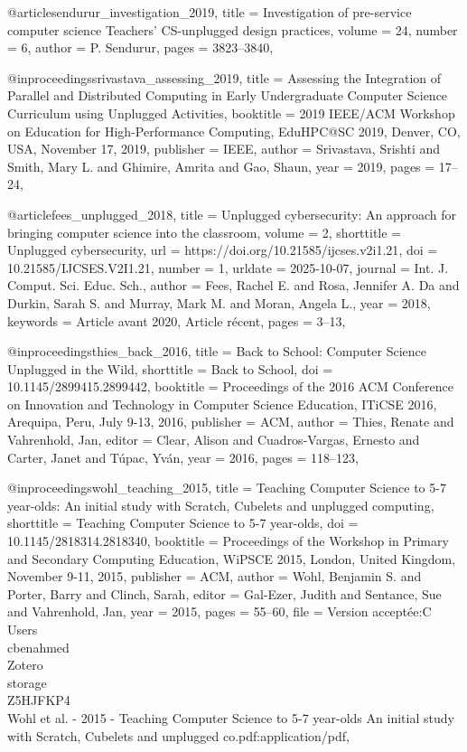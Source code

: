 @article{sendurur_investigation_2019,
	title = {Investigation of pre-service computer science Teachers' CS-unplugged design practices},
	volume = {24},
	number = {6},
	author = {P. Sendurur},
	pages = {3823--3840},
}

@inproceedings{srivastava_assessing_2019,
	title = {Assessing the Integration of Parallel and Distributed Computing in Early Undergraduate Computer Science 
Curriculum using Unplugged Activities},
	booktitle = {2019 IEEE/ACM Workshop on Education for High-Performance Computing, EduHPC@SC 2019, Denver, CO, USA, 
November 17, 2019},
	publisher = {IEEE},
	author = {Srivastava, Srishti and Smith, Mary L. and Ghimire, Amrita and Gao, Shaun},
	year = {2019},
	pages = {17--24},
}

@article{fees_unplugged_2018,
	title = {Unplugged cybersecurity: {An} approach for bringing computer science into the classroom},
	volume = {2},
	shorttitle = {Unplugged cybersecurity},
	url = {https://doi.org/10.21585/ijcses.v2i1.21},
	doi = {10.21585/IJCSES.V2I1.21},
	number = {1},
	urldate = {2025-10-07},
	journal = {Int. J. Comput. Sci. Educ. Sch.},
	author = {Fees, Rachel E. and Rosa, Jennifer A. Da and Durkin, Sarah S. and Murray, Mark M. and Moran, Angela L.},
	year = {2018},
	keywords = {Article avant 2020, Article récent},
	pages = {3--13},
}

@inproceedings{thies_back_2016,
	title = {Back to {School}: {Computer} {Science} {Unplugged} in the {Wild}},
	shorttitle = {Back to {School}},
	doi = {10.1145/2899415.2899442},
	booktitle = {Proceedings of the 2016 {ACM} {Conference} on {Innovation} and {Technology} in {Computer} {Science} 
{Education}, {ITiCSE} 2016, {Arequipa}, {Peru}, {July} 9-13, 2016},
	publisher = {ACM},
	author = {Thies, Renate and Vahrenhold, Jan},
	editor = {Clear, Alison and Cuadros-Vargas, Ernesto and Carter, Janet and Túpac, Yván},
	year = {2016},
	pages = {118--123},
}

@inproceedings{wohl_teaching_2015,
	title = {Teaching {Computer} {Science} to 5-7 year-olds: {An} initial study with {Scratch}, {Cubelets} and unplugged 
computing},
	shorttitle = {Teaching {Computer} {Science} to 5-7 year-olds},
	doi = {10.1145/2818314.2818340},
	booktitle = {Proceedings of the {Workshop} in {Primary} and {Secondary} {Computing} {Education}, {WiPSCE} 2015, 
{London}, {United} {Kingdom}, {November} 9-11, 2015},
	publisher = {ACM},
	author = {Wohl, Benjamin S. and Porter, Barry and Clinch, Sarah},
	editor = {Gal-Ezer, Judith and Sentance, Sue and Vahrenhold, Jan},
	year = {2015},
	pages = {55--60},
	file = {Version acceptée:C\:\\Users\\cbenahmed\\Zotero\\storage\\Z5HJFKP4\\Wohl et al. - 2015 - Teaching Computer 
Science to 5-7 year-olds An initial study with Scratch, Cubelets and unplugged co.pdf:application/pdf},
}

